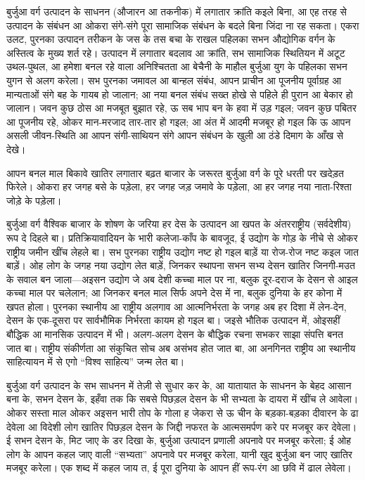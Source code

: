 \documentclass[12pt,a4paper,oneside]{book}
\begin{document}
बुर्जुआ वर्ग उत्पादन के साधनन (औजारन आ तकनीक) में लगातार क्रांति कइले बिना, आ एह तरह से उत्पादन के संबंधन आ ओकरा संगे-संगे पूरा सामाजिक संबंधन के बदले बिना जिंदा ना रह सकता। एकरा उलट, पुरनका उत्पादन तरीकन के जस के तस बचा के राखल पहिलका सभन औद्योगिक वर्गन के अस्तित्व के मुख्य शर्त रहे। उत्पादन में लगातार बदलाव आ क्रांति, सभ सामाजिक स्थितियन में अटूट उथल-पुथल, आ हमेशा बनल रहे वाला अनिश्चितता आ बेचैनी के माहौल बुर्जुआ युग के पहिलका सभन युगन से अलग करेला। सभ पुरनका जमावल आ बान्हल संबंध, आपन प्राचीन आ पूजनीय पूर्वाग्रह आ मान्यताओं संगे बह के गायब हो जालान; आ नया बनल संबंध सख्त होखे से पहिले ही पुरान आ बेकार हो जालान। जवन कुछ ठोस आ मजबूत बुझात रहे, ऊ सब भाप बन के हवा में उड़ गइल; जवन कुछ पबितर आ पूजनीय रहे, ओकर मान-मरजाद तार-तार हो गइल; आ अंत में आदमी मजबूर हो गइल कि ऊ आपन असली जीवन-स्थिति आ आपन संगी-साथियन संगे आपन संबंधन के खुली आ ठंडे दिमाग के आँख से देखे।

आपन बनल माल बिकावे खातिर लगातार बढ़त बाजार के जरूरत बुर्जुआ वर्ग के पूरे धरती पर खदेड़त फिरेले। ओकरा हर जगह बसे के पड़ेला, हर जगह जड़ जमावे के पड़ेला, आ हर जगह नया नाता-रिश्ता जोड़े के पड़ेला।

बुर्जुआ वर्ग वैश्विक बाजार के शोषण के जरिया हर देस के उत्पादन आ खपत के अंतरराष्ट्रीय (सर्वदेशीय) रूप दे दिहले बा। प्रतिक्रियावादियन के भारी कलेजा-काँप के बावजूद, ई उद्योग के गोड़ के नीचे से ओकर राष्ट्रीय जमीन खींच लेहले बा। सभ पुरनका राष्ट्रीय उद्योग नष्ट हो गइल बाड़ें या रोज-रोज नष्ट कइल जात बाड़ें। ओह लोग के जगह नया उद्योग लेत बाड़ें, जिनकर स्थापना सभन सभ्य देसन खातिर जिनगी-मउत के सवाल बन जाला—अइसन उद्योग जे अब देशी कच्चा माल पर ना, बलुक दूर-दराज के देसन से आइल कच्चा माल पर चलेलान; आ जिनकर बनल माल सिर्फ अपने देस में ना, बलुक दुनिया के हर कोना में खपत होला। पुरनका स्थानीय आ राष्ट्रीय अलगाव आ आत्मनिर्भरता के जगह अब हर दिशा में लेन-देन, देसन के एक-दूसरा पर सार्वभौमिक निर्भरता कायम हो गइल बा। जइसे भौतिक उत्पादन में, ओइसहीं बौद्धिक आ मानसिक उत्पादन में भी। अलग-अलग देसन के बौद्धिक रचना सभकर साझा संपत्ति बनत जात बा। राष्ट्रीय संकीर्णता आ संकुचित सोच अब असंभव होत जात बा, आ अनगिनत राष्ट्रीय आ स्थानीय साहित्यायन में से एगो “विश्व साहित्य” जन्म लेत बा।

बुर्जुआ वर्ग उत्पादन के सभ साधनन में तेज़ी से सुधार कर के, आ यातायात के साधनन के बेहद आसान बना के, सभन देसन के, इहँवा तक कि सबसे पिछड़ल देसन के भी सभ्यता के दायरा में खींच ले आवेला। ओकर सस्ता माल ओकर अइसन भारी तोप के गोला ह जेकरा से ऊ चीन के बड़का-बड़का दीवारन के ढा देवेला आ विदेशी लोग खातिर पिछड़ल देसन के जिद्दी नफरत के आत्मसमर्पण करे पर मजबूर कर देवेला। ई सभन देसन के, मिट जाए के डर दिखा के, बुर्जुआ उत्पादन प्रणाली अपनावे पर मजबूर करेला; ई ओह लोग के आपन कहल जाए वाली “सभ्यता” अपनावे पर मजबूर करेला, यानी खुद बुर्जुआ बन जाए खातिर मजबूर करेला। एक शब्द में कहल जाय त, ई पूरा दुनिया के आपन हीं रूप-रंग आ छवि में ढाल लेवेला।
\end{document}
